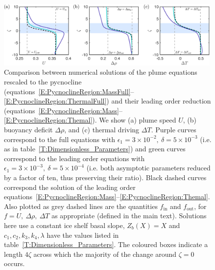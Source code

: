 \documentclass{jfm}
\newcommand{\epsone}{\epsilon_{1}} %
\newcommand{\lt}{\delta} %
\renewcommand{\in}{\text{in}} %
\newcommand{\out}{\text{out}}
\begin{document}
\begin{figure}
\centering
\includegraphics[width = 0.99\textwidth]{fig4_pycnocline_region}
\caption{Comparison between numerical solutions of the plume equations rescaled to the pycnocline (equations~\eqref{E:PycnoclineRegion:MassFull}--\eqref{E:PycnoclineRegion:ThermalFull}) and their leading order reduction (equations~\eqref{E:PycnoclineRegion:Mass}--\eqref{E:PycnoclineRegion:Themal}). We show (a) plume speed $U$, (b) buoyancy deficit $\Delta \rho$, and (c) thermal driving $\Delta T$. Purple curves correspond to the full equations with $\epsone = 3\times10^{-2}, ~\lt = 5\times10^{-3}$ (i.e. as in table~\ref{T:Dimensionless_Parameters}) and green curves correspond to the leading order equations with $\epsone = 3\times10^{-3},~ \lt = 5\times10^{-4}$ (i.e. both asymptotic parameters reduced by a factor of ten, thus preserving their ratio). Black dashed curves correspond the solution of the leading order equations~\eqref{E:PycnoclineRegion:Mass}--\eqref{E:PycnoclineRegion:Themal}. Also plotted as grey dashed lines are the quantities $f_{\in}$ and $f_{\out}$, for $f = U,~ \Delta \rho, ~\Delta T$ as appropriate (defined in the main text). Solutions here use a constant ice shelf basal slope, $Z_b(X) = X$ and $c_1, c_2, k_3,k_4, \lambda$ have the values listed in table~\ref{T:Dimensionless_Parameters}. The coloured boxes indicate a length $4 \zeta$ across which the majority of the change around $\zeta = 0 $ occurs.}\label{fig:PycnoclineAsymptotics}
\end{figure}
\end{document}
